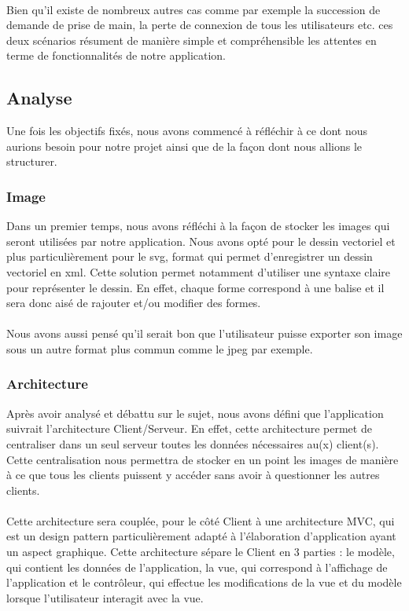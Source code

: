 \documentclass[a4paper,11pt]{article}
\begin{document}
\paragraph{} Bien qu'il existe de nombreux autres cas comme par exemple la succession de demande de prise de main, la perte de connexion de tous les utilisateurs etc. ces deux scénarios résument de manière simple et compréhensible les attentes en terme de fonctionnalités de notre application.


\subsection{Analyse}
Une fois les objectifs fixés, nous avons commencé à réfléchir à ce dont nous aurions besoin pour notre projet ainsi que de la façon dont nous allions le structurer.

\subsubsection{Image}
Dans un premier temps, nous avons réfléchi à la façon de stocker les images qui seront utilisées par notre application. Nous avons opté pour le dessin vectoriel et plus particulièrement pour le svg, format qui permet d'enregistrer un dessin vectoriel en xml. Cette solution permet notamment d'utiliser une syntaxe claire pour représenter le dessin. En effet, chaque forme correspond à une balise et il sera donc aisé de rajouter et/ou modifier des formes.

\paragraph{} Nous avons aussi pensé qu'il serait bon que l'utilisateur puisse exporter son image sous un autre format plus commun comme le jpeg par exemple. 

\subsubsection{Architecture}
Après avoir analysé et débattu sur le sujet, nous avons défini que l'application suivrait l'architecture Client/Serveur. En effet, cette architecture permet de centraliser dans un seul serveur toutes les données nécessaires au(x) client(s). Cette centralisation nous permettra de stocker en un point les images de manière à ce que tous les clients puissent y accéder sans avoir à questionner les autres clients.

\paragraph{} Cette architecture sera couplée, pour le côté Client à une architecture MVC, qui est un design pattern particulièrement adapté à l'élaboration d'application ayant un aspect graphique. Cette architecture sépare le Client en 3 parties : le modèle, qui contient les données de l'application, la vue, qui correspond à l'affichage de l'application et le contrôleur, qui effectue les modifications de la vue et du modèle lorsque l'utilisateur interagit avec la vue. 
\end{document}
